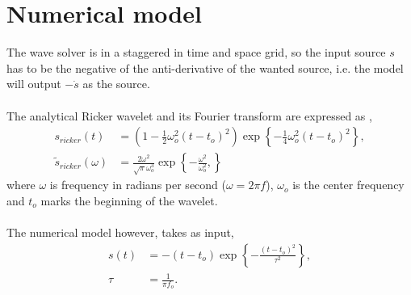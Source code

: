 \documentclass[a4paper,12pt]{article}
\begin{document}
\section*{Numerical model}
The wave solver is in a staggered in time and space grid, so the input source $s$ has to be the negative of the anti-derivative of the wanted source, i.e. the model will output $-\dot{s}$ as the source.
\\\\
The analytical Ricker wavelet and its Fourier transform are expressed as \cite[]{wang2015frequencies},
\begin{align}
s_{ricker}(t) &= \left(1 - \frac{1}{2}\omega_o^2(t-t_o)^2\right) \exp\left\{-\frac{1}{4}\omega_o^2(t-t_o)^2\right\}, \\
\tilde{s}_{ricker}(\omega) &= \frac{2\omega^2}{\sqrt{\pi}\omega_o^3}\exp\left\{ -\frac{\omega^2}{\omega_o^2}, \right\}
\end{align}
where $\omega$ is frequency in radians per second ($\omega=2\pi f$), $\omega_o$ is the center frequency and $t_o$ marks the beginning of the wavelet.
\\\\
The numerical model however, takes as input,
\begin{align}
s(t) &= -(t-t_o)\exp\left\{ -\frac{(t-t_o)^2}{\tau^2} \right\}, \\
\tau &= \frac{1}{\pi f_o}.
\end{align}
%
\end{document}
